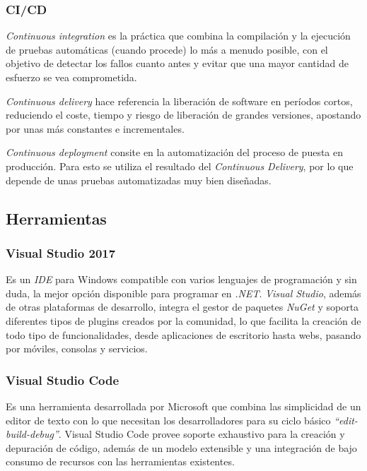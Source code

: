         \subsubsection{CI/CD}
            \textit{Continuous integration} es la práctica que combina la compilación y la ejecución de pruebas automáticas (cuando procede) lo más a menudo posible, con el objetivo de detectar los fallos cuanto antes y evitar que una mayor cantidad de esfuerzo se vea comprometida.
            
            \textit{Continuous delivery} hace referencia la liberación de software en períodos cortos, reduciendo el coste, tiempo y riesgo de liberación de grandes versiones, apostando por unas más constantes e incrementales.
            
            \textit{Continuous deployment} consite en la automatización del proceso de puesta en producción. Para esto se utiliza el resultado del \textit{Continuous Delivery}, por lo que depende de unas pruebas automatizadas muy bien diseñadas. \cite{ci} \cite{cd} \cite{cicd}

    \subsection{Herramientas} 
        \subsubsection{Visual Studio 2017}
            Es un \textit{IDE} para Windows compatible con varios lenguajes de programación y sin duda, la mejor opción disponible para programar en \textit{.NET}. \textit{Visual Studio}, además de otras plataformas de desarrollo, integra el gestor de paquetes \textit{NuGet} y soporta diferentes tipos de plugins creados por la comunidad, lo que facilita la creación de todo tipo de funcionalidades, desde aplicaciones de escritorio hasta webs, pasando por móviles, consolas y servicios. \cite{visualstudio} \cite{wikivisualstudio}

        \subsubsection{Visual Studio Code}
            Es una herramienta desarrollada por Microsoft que combina las simplicidad de un editor de texto con lo que necesitan los desarrolladores para su ciclo básico \textit{``edit-build-debug''}. Visual Studio Code provee soporte exhaustivo para la creación y depuración de código, además de un modelo extensible y una integración de bajo consumo de recursos con las herramientas existentes.

